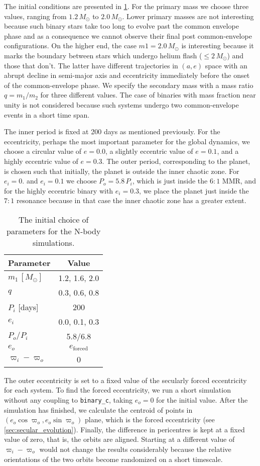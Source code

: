 \documentclass[ twoside,openright,titlepage,numbers=noenddot,headinclude,%
                footinclude=true,cleardoublepage=empty,abstractoff, %
                BCOR=5mm,paper=a4,fontsize=11pt,%
                american,%
                ]{scrreprt}
\begin{document}
The initial conditions are presented in \cref{table:initial_conditions}. For the 
primary mass we choose three values, ranging from $1.2\,M_\odot$ to $2.0\,M_\odot$.
Lower primary masses are not interesting because such binary stars take too long
to evolve past the common envelope phase and as a consequence we cannot observe
their final post common-envelope configurations. On the higher end, the case
$m1=2.0\,M_\odot$ is interesting because it marks the boundary between stars which
undergo helium flash ($\leq 2\,M_\odot$) and those that don't. The latter have
different trajectories in $(a,e)$ space with an abrupt decline in semi-major 
axis and eccentricity immediately before the onset of the common-envelope phase.
We specify the secondary mass with a mass ratio $q=m_1/m_2$ for three different 
values. The case of binaries with mass fraction near unity is not considered
because such systems undergo two common-envelope events in a short time span.

The inner period is fixed at 200 days as mentioned previously. For the 
eccentricity, perhaps the most important parameter for the global dynamics, 
we choose a circular value of $e=0.0$, a slightly eccentric value of $e=0.1$,
and a highly eccentric value of $e=0.3$. The outer period, corresponding
to the planet, is chosen such that initially, the planet is outside the 
inner chaotic zone. For $e_i=0.$ and $e_i=0.1$ we choose $P_o=5.8\,P_i$, which
is just inside the $6:1$ MMR, and for the highly eccentric binary with $e_i=0.3$,
we place the planet just inside the $7:1$ resonance because in that case the 
inner chaotic zone has a greater extent.
\begin{table}[h!]
\centering
\begin{tabular}{lc}
\toprule
    Parameter &  Value\\
\midrule
    $m_1\,[M_\odot]$ &1.2, 1.6, 2.0\\
    $q$&0.3, 0.6, 0.8\\
    $P_i$ [days]& 200\\
    $e_i$ &0.0, 0.1, 0.3\\
    $P_o/P_i$ & 5.8/6.8 \\
    $e_o$&$e_\text{forced}$\\
    $\varpi_i-\varpi_o$  & 0\\
         \bottomrule
\end{tabular}
    \caption{The initial choice of parameters for the N-body simulations.}
\label{table:initial_conditions}
\end{table}

The outer eccentricity is set to a fixed value of the secularly forced 
eccentricity for each system. To find the forced eccentricity, we 
run a short  simulation without any coupling to 
\texttt{binary\_c}, taking $e_o=0$ for the initial value. After the 
simulation has finished, we calculate the centroid of points in 
$(e_o\cos\varpi_o,e_o\sin\varpi_o)$ plane, which is the forced eccentricity
(see \cref{sec:secular_evolution}). Finally, the difference in pericentres
is kept at a fixed value of zero, that is, the orbits are aligned. Starting
at a different value of $\varpi_i-\varpi_o$ would not change the results 
considerably
because the relative orientations of the two orbits become randomized on a short 
timescale.
\end{document}
